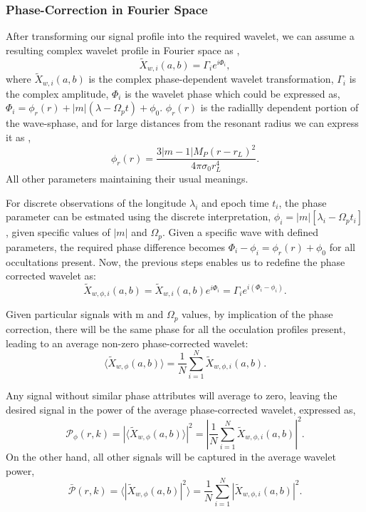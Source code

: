 \documentclass{article}
\begin{document}
\subsubsection{Phase-Correction in Fourier Space}
After transforming our signal profile into the required wavelet, we can assume a resulting complex wavelet profile in Fourier space as \cite{Hedman_2018}, 
\begin{equation}
    \tilde{X}_{w,i}(a,b) = \Gamma_{i}e^{i\Phi_{i}},
\end{equation}
where $\tilde{X}_{w,i}(a,b)$ is the complex phase-dependent wavelet transformation, $\Gamma_{i}$ is the complex amplitude, $\Phi_{i}$ is the wavelet phase which could be expressed as, $\Phi_{i} = \phi_{r}(r) + |m|(\lambda - \Omega_{p}t) + \phi_{0}$. $\phi_{r}(r)$ is the radiallly dependent portion of the wave-sphase, and for large distances from the resonant radius we can express it as \cite{1984prin.conf..513S},
\begin{equation}
    \phi_{r}(r) = \frac{3|m-1|M_{P}(r - r_{L})^{2}}{4\pi\sigma_{0}r^{4}_{L}}.
\end{equation}
All other parameters maintaining their usual meanings.   

For discrete observations of the longitude $\lambda_{i}$ and epoch time $t_{i}$, the phase parameter can be estmated using the discrete interpretation, $\phi_{i} = |m|[\lambda_{i} - \Omega_{p}t_{i}]$, given specific values of $|m|$ and $\Omega_{p}$. Given a specific wave with defined parameters, the required phase difference becomes $\Phi_{i} - \phi_{i} = \phi_{r}(r) + \phi_{0}$ for all occultations present. Now, the previous steps enables us to redefine the phase corrected wavelet as:
\begin{equation}
    \tilde{X}_{w,\phi,i}(a,b) = \tilde{X}_{w,i}(a,b)e^{i\Phi_{i}} = \Gamma_{i}e^{i(\Phi_{i} - \phi_{i})}.
\end{equation}

Given particular signals with m and $\Omega_{p}$ values, by implication of the phase correction, there will be the same phase for all the occulation profiles present, leading to an average non-zero phase-corrected wavelet:
\begin{equation}
    \langle\tilde{X}_{w,\phi}(a,b)\rangle = \frac{1}{N} \sum_{i=1}^{N}\tilde{X}_{w,\phi,i}(a,b).
\end{equation}

Any signal without similar phase attributes will average to zero, leaving the desired signal in the power of the average phase-corrected wavelet, expressed as,
\begin{equation}
    \mathcal{P}_{\phi}(r,k) = |\langle\tilde{X}_{w,\phi}(a,b)\rangle|^{2} = \left|\frac{1}{N} \sum_{i=1}^{N}\tilde{X}_{w,\phi,i}(a,b)\right|^{2}.
\end{equation}
On the other hand, all other signals will be captured in the average wavelet power,
\begin{equation}
     \bar{\mathcal{P}}(r,k) = \langle|\tilde{X}_{w,\phi}(a,b)|^{2}\rangle = \frac{1}{N} \sum_{i=1}^{N}|\tilde{X}_{w,\phi,i}(a,b)|^{2}.
\end{equation}
\end{document}
